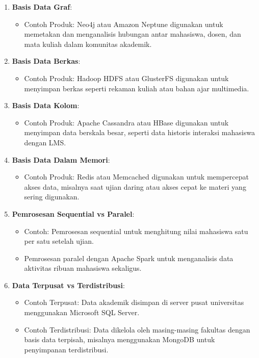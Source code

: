 \begin{enumerate}
	\item \textbf{Basis Data Graf}: 
	\begin{itemize}
		\item Contoh Produk: Neo4j atau Amazon Neptune digunakan untuk memetakan dan menganalisis hubungan antar mahasiswa, dosen, dan mata kuliah dalam komunitas akademik.
	\end{itemize}
	
	\item \textbf{Basis Data Berkas}: 
	\begin{itemize}
		\item Contoh Produk: Hadoop HDFS atau GlusterFS digunakan untuk menyimpan berkas seperti rekaman kuliah atau bahan ajar multimedia.
	\end{itemize}
	
	\item \textbf{Basis Data Kolom}: 
	\begin{itemize}
		\item Contoh Produk: Apache Cassandra atau HBase digunakan untuk menyimpan data berskala besar, seperti data historis interaksi mahasiswa dengan LMS.
	\end{itemize}
	
	\item \textbf{Basis Data Dalam Memori}: 
	\begin{itemize}
		\item Contoh Produk: Redis atau Memcached digunakan untuk mempercepat akses data, misalnya saat ujian daring atau akses cepat ke materi yang sering digunakan.
	\end{itemize}
	
	\item \textbf{Pemrosesan Sequential vs Paralel}: 
	\begin{itemize}
		\item Contoh: Pemrosesan sequential untuk menghitung nilai mahasiswa satu per satu setelah ujian.
		\item Pemrosesan paralel dengan Apache Spark untuk menganalisis data aktivitas ribuan mahasiswa sekaligus.
	\end{itemize}
	
	\item \textbf{Data Terpusat vs Terdistribusi}: 
	\begin{itemize}
		\item Contoh Terpusat: Data akademik disimpan di server pusat universitas menggunakan Microsoft SQL Server.
		\item Contoh Terdistribusi: Data dikelola oleh masing-masing fakultas dengan basis data terpisah, misalnya menggunakan MongoDB untuk penyimpanan terdistribusi.
	\end{itemize}
	

\end{enumerate}
